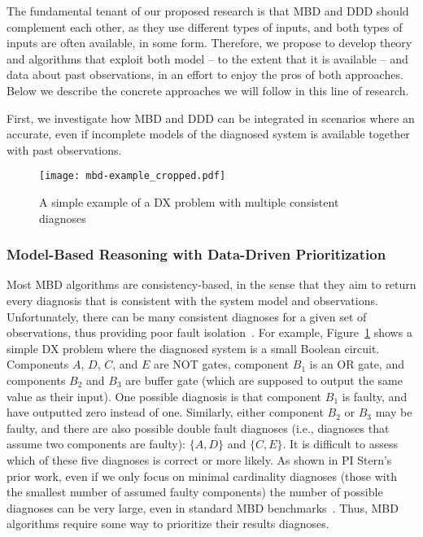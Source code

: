 \documentclass[12pt]{article}
\begin{document}
The fundamental tenant of our proposed research is that MBD and DDD should complement each other, as they use different types of inputs, and both types of inputs are often available, in some form. Therefore, we propose to develop theory and algorithms that exploit both model -- to the extent that it is available -- and data about past observations, in an effort to enjoy the pros of both approaches. Below we describe the concrete approaches we will follow in this line of research.

First, we investigate how MBD and DDD can be integrated in scenarios where an accurate, even if incomplete models of the diagnosed system is available together with past observations. 


\begin{figure}
    \centering
	\texttt{[image: mbd-example\_cropped.pdf]}
    \caption{A simple example of a DX problem with multiple consistent diagnoses}
    \label{fig:mbd-example}
\end{figure}

\subsubsection{Model-Based Reasoning with Data-Driven Prioritization} 
Most MBD algorithms are consistency-based, in the sense that they aim to return every diagnosis  that is consistent with the system model and observations. 
Unfortunately, there can be many consistent diagnoses for a given set of observations, thus providing poor fault isolation~\cite{stern2015many}. 
For example, Figure~\ref{fig:mbd-example} shows a simple DX problem where the diagnosed system is a small Boolean circuit. Components $A$, $D$, $C$, and $E$ are NOT gates, component $B_1$ is an OR gate, and components $B_2$ and $B_3$ are buffer gate (which are supposed to output the same value as their input). One possible diagnosis is that component $B_1$ is faulty, and have outputted zero instead of one. Similarly, either component $B_2$ or $B_3$ may be faulty, 
and there are also possible double fault diagnoses (i.e., diagnoses that assume two components are faulty): $\{ A,D \}$ and $\{C,E\}$. It is difficult to assess which of these five diagnoses is correct or more likely. 
As shown in PI Stern's prior work, even if we only focus on minimal cardinality diagnoses (those with the smallest number of assumed faulty components) the number of possible diagnoses can be very large, even in standard MBD benchmarks~\cite{stern2015many}. Thus, MBD algorithms require some way to prioritize their results diagnoses. 
\end{document}
